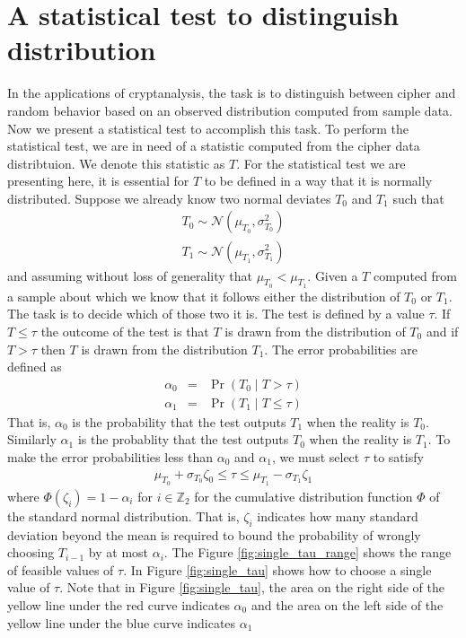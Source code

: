 \section{A statistical test to distinguish distribution} \label{section:statistical_test} In the applications of cryptanalysis, the task is to distinguish between cipher and random behavior based on an observed distribution computed from sample data. Now we present a statistical test to accomplish this task. To perform the statistical test, we are in need of a statistic computed from the cipher data distribtuion. We denote this statistic as $T$. For the statistical test we are presenting here, it is essential for $T$ to be defined in a way that it is normally distributed. Suppose we already know two normal deviates $T_0$ and $T_1$ such that
\begin{eqnarray*}
T_0 \sim \mathcal{N}\left(\mu_{T_0},\sigma^{2}_{T_0} \right)\\
T_1 \sim \mathcal{N}\left(\mu_{T_1},\sigma^{2}_{T_1} \right)
\end{eqnarray*} and assuming without loss of generality that $\mu_{T_0} < \mu_{T_1}$. Given a $T$ computed from a sample about which we know that it follows either the distribution of $T_0$ or $T_1$. The task is to decide which of those two it is. The test is defined by a value $\tau$. If $T\leq \tau$ the outcome of the test is that $T$ is drawn from the distribution of $T_0$ and if $T > \tau$ then $T$ is drawn from the distribution $T_1$. The error probabilities are defined as 
\begin{eqnarray*}
\alpha_0 &=& \Pr\left(T_0\;|\;T > \tau\right)\\
\alpha_1 &=& \Pr\left(T_1\;|\;T \leq \tau \right)
\end{eqnarray*}
That is, $\alpha_0$ is the probability that the test outputs $T_1$ when the reality is $T_0$. Similarly $\alpha_1$ is the probablity that the test outputs $T_0$ when the reality is $T_1$. To make the error probabilities less than $\alpha_0$ and $\alpha_1$, we must select $\tau$ to satisfy
\begin{eqnarray}
\mu_{T_0} + \sigma_{T_0}\zeta_0 \leq \tau \leq \mu_{T_1} - \sigma_{T_1}\zeta_1 \label{eqn:selecting_tau_range}
\end{eqnarray} where $\mathit{\Phi}(\zeta_i) = 1 - \alpha_i$ for $i \in \mathbb{Z}_2$ for the cumulative distribution function $\mathit{\Phi}$ of the standard normal distribution. That is, $\zeta_i$ indicates how many standard deviation beyond the mean is required to bound the probability of wrongly choosing $T_{i-1}$ by at most $\alpha_i$. The Figure \ref{fig:single_tau_range} shows the range of feasible values of $\tau$. In Figure \ref{fig:single_tau} shows how to choose a single value of $\tau$. Note that in Figure \ref{fig:single_tau}, the area on the right side of the yellow line under the red curve indicates $\alpha_0$ and the area on the left side of the yellow line under the blue curve indicates $\alpha_1$

